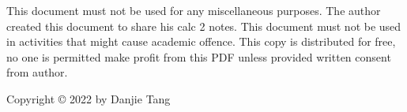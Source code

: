 \maketitle
	\begin{center}
	This document must not be used for any miscellaneous purposes. The author created this document to share his calc 2 notes. This document must not be used in activities that might cause academic offence. This copy is distributed for free, no one is permitted make profit from this PDF unless provided written consent from author.
	
	Copyright © 2022 by Danjie Tang
	\end{center}
	\tableofcontents
	\newpage